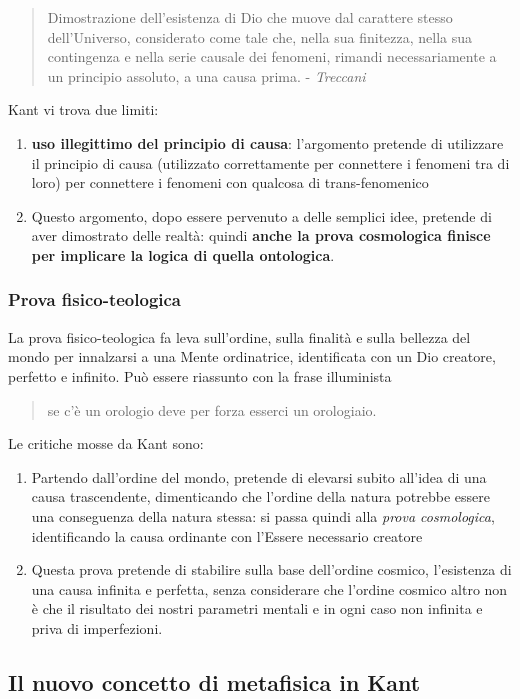 \documentclass[a4paper, twoside, titlepage]{book}
\newcommand{\citazione}[1]{%
  \begin{quotation}
  #1
  \end{quotation}}
\begin{document}
\citazione{Dimostrazione dell’esistenza di Dio che muove dal carattere stesso dell’Universo, considerato come tale che, nella sua finitezza, nella sua contingenza e nella serie causale dei fenomeni, rimandi necessariamente a un principio assoluto, a una causa prima. - \textit{Treccani}}


Kant vi trova due limiti:
\begin{enumerate}
\item \textbf{uso illegittimo del principio di causa}: l’argomento pretende di utilizzare il principio di causa (utilizzato correttamente per connettere i fenomeni tra di loro) per connettere i fenomeni con qualcosa di trans-fenomenico
\item Questo argomento, dopo essere pervenuto a delle semplici idee, pretende di aver dimostrato delle realtà: quindi \textbf{anche la prova cosmologica finisce per implicare la logica di quella ontologica}.
\end{enumerate}

\subsubsection{Prova fisico-teologica}

La prova fisico-teologica fa leva sull’ordine, sulla finalità e sulla bellezza del mondo per innalzarsi a una Mente ordinatrice, identificata con un Dio creatore, perfetto e infinito. Può essere riassunto con la frase illuminista
\citazione{se c’è un orologio deve per forza esserci un orologiaio.}

Le critiche mosse da Kant sono:
\begin{enumerate}
\item Partendo dall’ordine del mondo, pretende di elevarsi subito all’idea di una causa trascendente, dimenticando che l’ordine della natura potrebbe essere una conseguenza della natura stessa: si passa quindi alla \textit{prova cosmologica}, identificando la causa ordinante con l’Essere necessario creatore
\item Questa prova pretende di stabilire sulla base dell’ordine cosmico, l’esistenza di una causa infinita e perfetta, senza considerare che l’ordine cosmico altro non è che il risultato dei nostri parametri mentali e in ogni caso non infinita e priva di imperfezioni.
\end{enumerate}

\subsection{Il nuovo concetto di metafisica in Kant}
\end{document}

